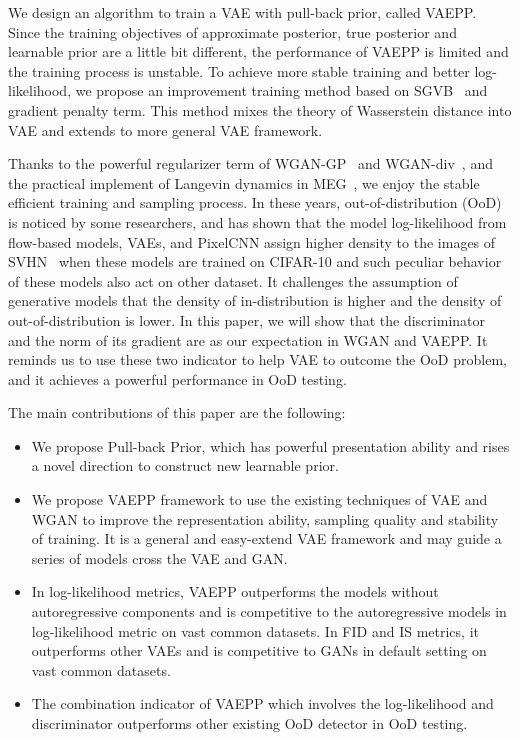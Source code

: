 We design an algorithm to train a VAE with pull-back prior, called VAEPP. Since the training objectives of approximate posterior, true posterior and learnable prior are a little bit different, the performance of VAEPP is limited and the training process is unstable. To achieve more stable training and better log-likelihood, we propose an improvement training method based on SGVB~\cite{kingma2014auto} and gradient penalty term. This method mixes the theory of Wasserstein distance into VAE and extends to more general VAE framework. 

Thanks to the powerful regularizer term of WGAN-GP~\cite{gulrajani2017improved} and WGAN-div~\cite{wu2018wasserstein}, and the practical implement of Langevin dynamics in MEG~\cite{kumar2019maximum}, we enjoy the stable efficient training and sampling process. In these years, out-of-distribution (OoD) is noticed by some researchers, and \cite{nalisnick2018deep} has shown that the model log-likelihood from flow-based models, VAEs, and PixelCNN assign higher density to the images of SVHN~\cite{netzer2011reading} when these models are trained on CIFAR-10 and such peculiar behavior of these models also act on other dataset. It challenges the assumption of generative models that the density of in-distribution is higher and the density of out-of-distribution is lower. In this paper, we will show that the discriminator and the norm of its gradient are as our expectation in WGAN and VAEPP. It reminds us to use these two indicator to help VAE to outcome the OoD problem, and it achieves a powerful performance in OoD testing.

The main contributions of this paper are the following:
\begin{itemize}
	\item We propose Pull-back Prior, which has powerful presentation ability and rises a novel direction to construct new learnable prior. 
	\item We propose VAEPP framework to use the existing techniques of VAE and WGAN to improve the representation ability, sampling quality and stability of training. It is a general and easy-extend VAE framework and may guide a series of models cross the VAE and GAN. 
	\item In log-likelihood metrics, VAEPP outperforms the models without autoregressive components and is competitive to the autoregressive models in log-likelihood metric on vast common datasets. In FID and IS metrics, it outperforms other VAEs and is competitive to GANs in default setting on vast common datasets. 
	\item The combination indicator of VAEPP which involves the log-likelihood and discriminator outperforms other existing OoD detector in OoD testing.
\end{itemize}
